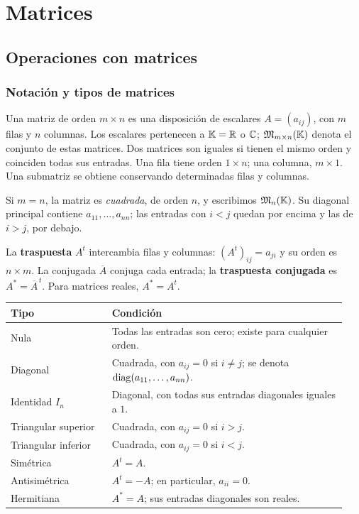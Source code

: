 \chapter{Matrices}
\label{cap:matrices}

\section{Operaciones con matrices}
\label{sec:operaciones}

\subsection*{Notación y tipos de matrices}

Una matriz de orden $m\times n$ es una disposición de escalares $A=(a_{ij})$,
con $m$ filas y $n$ columnas. Los escalares pertenecen a $\mathbb{K}=\mathbb{R}$ o $\mathbb{C}$;
$\mathfrak{M}_{m\times n}(\mathbb{K})$ denota el conjunto de estas matrices. Dos matrices
son iguales si tienen el mismo orden y coinciden todas sus entradas.
Una fila tiene orden $1\times n$; una columna, $m\times1$.
Una submatriz se obtiene conservando determinadas filas y columnas.

Si $m=n$, la matriz es \emph{cuadrada}, de orden $n$, y escribimos
$\mathfrak{M}_n(\mathbb{K})$. Su diagonal principal contiene $a_{11},\ldots,a_{nn}$;
las entradas con $i<j$ quedan por encima y las de $i>j$, por debajo.

La \textbf{traspuesta} $A^t$ intercambia filas y columnas:
$(A^t)_{ij}=a_{ji}$ y su orden es $n\times m$. La conjugada $\overline A$
conjuga cada entrada; la \textbf{traspuesta conjugada} es
$A^*=\overline A^{\,t}$. Para matrices reales, $A^*=A^t$.

\begin{center}
\small
\begin{tabular}{@{}p{0.29\linewidth}p{0.65\linewidth}@{}}
\toprule
Tipo & Condición \\
\midrule
Nula & Todas las entradas son cero; existe para cualquier orden. \\
Diagonal & Cuadrada, con $a_{ij}=0$ si $i\ne j$;
se denota $\operatorname{diag}(a_{11},\ldots,a_{nn})$. \\
Identidad $I_n$ & Diagonal, con todas sus entradas diagonales iguales a $1$. \\
Triangular superior & Cuadrada, con $a_{ij}=0$ si $i>j$. \\
Triangular inferior & Cuadrada, con $a_{ij}=0$ si $i<j$. \\
Simétrica & $A^t=A$. \\
Antisimétrica & $A^t=-A$; en particular, $a_{ii}=0$. \\
Hermitiana & $A^*=A$; sus entradas diagonales son reales. \\
\bottomrule
\end{tabular}
\end{center}

